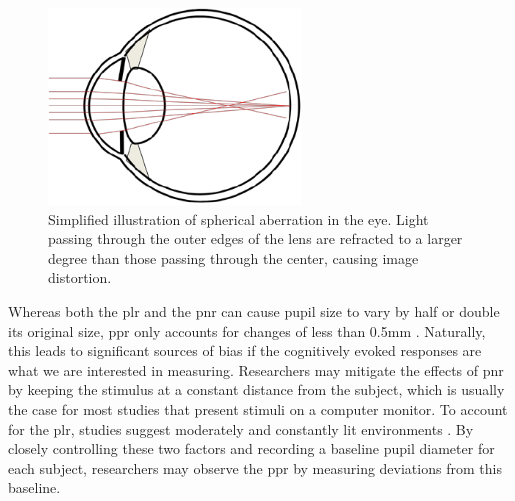 \begin{figure}[h]
    \centering
    \includegraphics[width=0.6\textwidth]{figures/bt_spherical_aberration.png}
    \caption{Simplified illustration of spherical aberration in the eye. Light passing through the outer edges of the lens are refracted to a larger degree than those passing through the center, causing image distortion. }
    \label{fig:bt/spherical_aberration}
\end{figure}

Whereas both the \acrshort{plr} and the \acrshort{pnr} can cause pupil size to vary by half or double its original size, \acrshort{ppr} only accounts for changes of less than 0.5mm \cite{beatty1982}. Naturally, this leads to significant sources of bias if the cognitively evoked responses are what we are interested in measuring. Researchers may mitigate the effects of \acrshort{pnr} by keeping the stimulus at a constant distance from the subject, which is usually the case for most studies that present stimuli on a computer monitor. To account for the \acrshort{plr}, studies suggest moderately and constantly lit environments \cite{steinauer2004}. By closely controlling these two factors and recording a baseline pupil diameter for each subject, researchers may observe the \acrshort{ppr} by measuring deviations from this baseline. 






